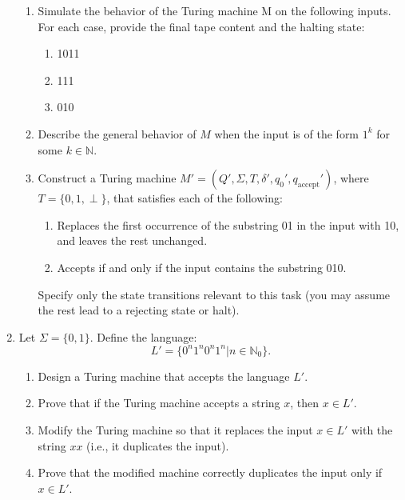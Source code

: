 \documentclass{article}
\begin{document}
\begin{enumerate}
        \begin{enumerate}
            \item Simulate the behavior of the Turing machine M on the following inputs. For each case, provide the final tape content and the halting state:
            \begin{enumerate}
                \item  1011
                \item  111
                \item 010
            \end{enumerate}
        \item Describe the general behavior of $M$ when the input is of the form $1^{k}$ for some $k\in \mathbb{N}$.
        \item Construct a Turing machine $M'=(Q',\Sigma,T,\delta',q_0',q_{\text{accept}}')$, where $T=\{0,1,\perp \} $, that satisfies each of the following:
            \begin{enumerate}
                \item Replaces the first occurrence of the substring 01 in the input with 10, and leaves the rest unchanged.
                \item Accepts if and only if the input contains the substring 010. 
            \end{enumerate}
        Specify only the state transitions relevant to this task (you may assume the rest lead to a rejecting state or halt).
        \end{enumerate}

    \item Let $\Sigma=\{0,1\} .$ Define the language:
        \[
        L'=\{0^{n}1^{n}0^{n}1^{n}|n\in \mathbb{N}_0\} 
        .\] 
        \begin{enumerate}[label= (\alph*)] 
            \item Design a Turing machine that accepts the language $L'$.
            \item Prove that if the Turing machine accepts a string $x$, then $x\in L'$.
            \item Modify the Turing machine so that it replaces the input $x\in L'$ with the string $xx$ (i.e.,
            it duplicates the input).
            \item Prove that the modified machine correctly duplicates the input only if $x\in L'$.
        \end{enumerate}
\end{enumerate}
\end{document}
